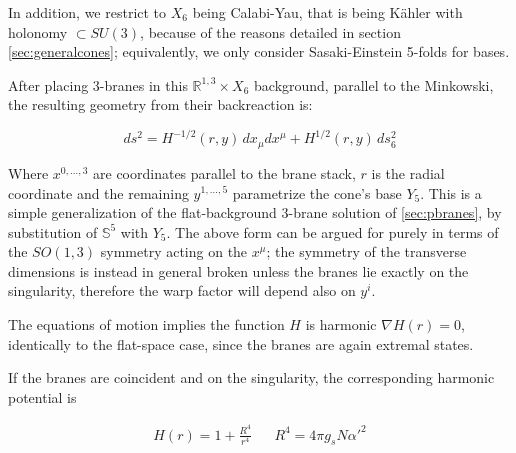 In addition, we restrict to $X_6$ being Calabi-Yau, that is being K\"ahler with holonomy $\subset SU(3)$, because of the reasons detailed in section \ref{sec:generalcones}; equivalently, we only consider Sasaki-Einstein 5-folds for bases.%
%
%
%
%

After placing 3-branes in this $\mathbb{R}^{1,3} \times X_6$ background, parallel to the Minkowski, the resulting geometry from their backreaction is:

\begin{equation}
ds^2 = H^{-1/2}(r,y) \, dx_\mu dx^\mu + H^{1/2}(r,y) \, ds_6^2
\end{equation}

Where $x^{0,\ldots,3}$ are coordinates parallel to the brane stack, $r$ is the radial coordinate and the remaining $y^{1,\ldots,5}$ parametrize the cone's base $Y_5$. This is a simple generalization of the flat-background 3-brane solution of \ref{sec:pbranes}, by substitution of $\mathbb{S}^5$ with $Y_5$. The above form can be argued for purely in terms of the $SO(1,3)$ symmetry acting on the $x^\mu$; the symmetry of the transverse dimensions is instead in general broken unless the branes lie exactly on the singularity, therefore the warp factor will depend also on $y^i$.

The equations of motion implies the function $H$ is harmonic $\nabla H(r) = 0$, identically to the flat-space case, since the branes are again extremal states.

If the branes are coincident and on the singularity, the corresponding harmonic potential is

\begin{align}
 H(r) = 1 + \frac{R^4}{r^4} && R^4 = 4 \pi g_s N \alpha'^2 
\end{align}

